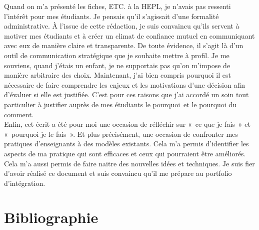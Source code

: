 Quand on m'a présenté les fiches, ETC. à la HEPL, je n'avais pas ressenti l'intérêt pour mes étudiants. Je pensais qu'il s'agissait d'une formalité administrative. À l'issue de cette rédaction, je suis convaincu qu'ils servent à motiver mes étudiants et à créer un climat de confiance mutuel en communiquant avec eux de manière claire et transparente. De toute évidence, il s'agit là d'un outil de communication stratégique que je souhaite mettre à profil. Je me souviens, quand j'étais un enfant, je ne supportais pas qu'on m'impose de manière arbitraire des choix. Maintenant, j'ai bien compris pourquoi il est nécessaire de faire comprendre les enjeux et les motivations d'une décision afin d’évaluer si elle est justifiée. C'est pour ces raisons que j'ai accordé un soin tout particulier à justifier auprès de mes étudiants le pourquoi~et le pourquoi du comment. \\
Enfin, cet écrit a été pour moi une occasion de réfléchir sur «~ce que je fais~» et «~pourquoi je le fais~». Et plus précisément, une occasion de confronter mes pratiques d'enseignants à des modèles existants. Cela m'a permis d’identifier les aspects de ma pratique qui sont efficaces et ceux qui pourraient être améliorés. Cela m'a aussi permis de faire naitre des nouvelles idées et techniques. Je suis fier d'avoir réalisé ce document et suis convaincu qu'il me prépare au portfolio d'intégration.


\clearpage
\section{Bibliographie}
\printbibliography[heading=none]

%
%






